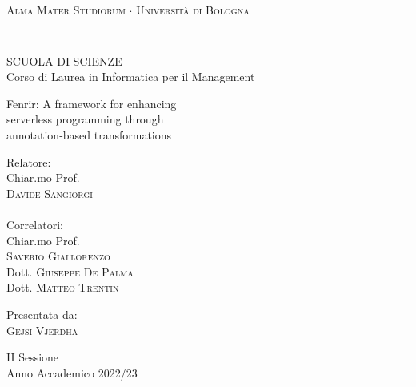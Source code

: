 \begin{otherlanguage}{italian}
\begin{titlepage}
\begin{center}
{{\Large{\textsc{Alma Mater Studiorum $\cdot$ Universit\`a di
Bologna}}}} \rule[0.1cm]{15.8cm}{0.1mm}
\rule[0.5cm]{15.8cm}{0.6mm}
{\small{ SCUOLA DI SCIENZE\\
Corso di Laurea in Informatica per il Management}}
\end{center}
\vspace{15mm}
\begin{center}
{\LARGE{ Fenrir: A framework for enhancing  }}\\ %
\vspace{3mm}
{\LARGE{ serverless programming through  }}\\
\vspace{3mm}
{\LARGE{ annotation-based transformations }}\\
\end{center}
\vspace{35mm}
\par
\noindent
\begin{minipage}[t]{0.47\textwidth}
{\large{ Relatore:\\
Chiar.mo Prof.\\
\textsc{Davide Sangiorgi}\\\\
Correlatori:\\
Chiar.mo Prof.\\
\textsc{Saverio Giallorenzo}
\\Dott.
\textsc{Giuseppe De Palma}
\\Dott.
\textsc{Matteo Trentin}
}}
\end{minipage}
\hfill
\begin{minipage}[t]{0.47\textwidth}\raggedleft
{\large{ Presentata da:\\
\textsc{Gejsi Vjerdha}}}
\end{minipage}
\vspace{20mm}
\begin{center}
{\large{ II Sessione\\
Anno Accademico 2022/23 }}%
\end{center}
\end{titlepage}
\end{otherlanguage}
